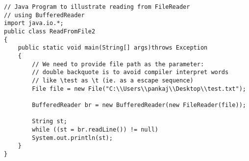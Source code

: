 \centering
\begin{lstlisting}[tabsize=4,caption={File reading java code example from GeeksforGeeks},label={lst:code-example}]
// Java Program to illustrate reading from FileReader 
// using BufferedReader 
import java.io.*; 
public class ReadFromFile2 
{ 
	public static void main(String[] args)throws Exception 
	{ 
		// We need to provide file path as the parameter: 
		// double backquote is to avoid compiler interpret words 
		// like \test as \t (ie. as a escape sequence) 
		File file = new File("C:\\Users\\pankaj\\Desktop\\test.txt"); 
		
		BufferedReader br = new BufferedReader(new FileReader(file)); 
		
		String st; 
		while ((st = br.readLine()) != null) 
		System.out.println(st); 
	} 
} 
\end{lstlisting}
\flushleft

